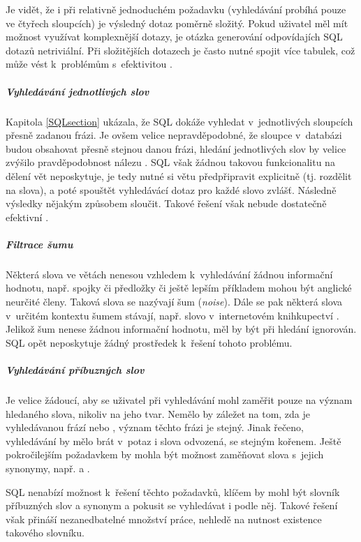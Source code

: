 \documentclass[11pt,oneside]{fithesis2}
\begin{document}
Je vidět, že i při relativně jednoduchém požadavku (vyhledávání probíhá pouze ve čtyřech sloupcích) je výsledný dotaz poměrně složitý. Pokud uživatel měl mít možnost využívat komplexnější
dotazy, je otázka generování odpovídajích SQL dotazů netriviální. Při složitějších dotazech je často nutné spojit více tabulek, což může vést k~problémům s~efektivitou \cite[s.~9]{HibernateSearchAction}.

\subparagraph{Vyhledávání jednotlivých slov}
Kapitola \ref{SQLsection} ukázala, že SQL dokáže vyhledat v~jednotlivých sloupcích přesně zadanou frázi. Je ovšem velice nepravděpodobné, že sloupce v~databázi budou obsahovat přesně stejnou danou frázi, 
hledání jednotlivých slov by velice zvýšilo pravděpodobnost nálezu \cite[s.~9]{HibernateSearchAction}. SQL však žádnou takovou funkcionalitu na dělení vět neposkytuje, je tedy nutné si větu předpřipravit explicitně (tj. rozdělit na slova),
a poté spouštět vyhledávácí dotaz pro každé slovo zvlášť. Následně výsledky nějakým způsobem sloučit. Takové řešení však nebude dostatečně efektivní \cite[s.~10]{HibernateSearchAction}. 

\subparagraph{Filtrace šumu}
Některá slova ve větách nenesou vzhledem k~vyhledávání žádnou informační hodnotu, např. spojky či předložky či ještě lepším příkladem mohou být anglické neurčité členy. Taková slova se nazývají šum (\emph{noise}). Dále se pak některá slova v~určitém kontextu
šumem stávají, např. slovo  v~internetovém knihkupectví \cite[s.~9]{HibernateSearchAction}. Jelikož šum nenese žádnou informační hodnotu, měl by být při hledání ignorován. SQL opět neposkytuje žádný prostředek k~řešení tohoto problému.

\subparagraph{Vyhledávání příbuzných slov}
Je velice žádoucí, aby se uživatel při vyhledávání mohl zaměřit pouze na význam hledaného slova, nikoliv na jeho tvar. Nemělo by záležet na tom, zda je vyhledávanou frází  nebo , význam těchto frázi
je stejný. Jinak řečeno, vyhledávání by mělo brát v~potaz i slova odvozená, se stejným kořenem. Ještě pokročilejším požadavkem by mohla být možnost zaměňovat slova s~jejich synonymy, např.  a  \cite[s.~10]{HibernateSearchAction}.

SQL nenabízí možnost k~řešení těchto požadavků, klíčem by mohl být slovník příbuzných slov a synonym a pokusit se vyhledávat i podle něj. Takové řešení však přináší nezanedbatelné množství práce, nehledě na nutnost existence takového slovníku.
\end{document}
